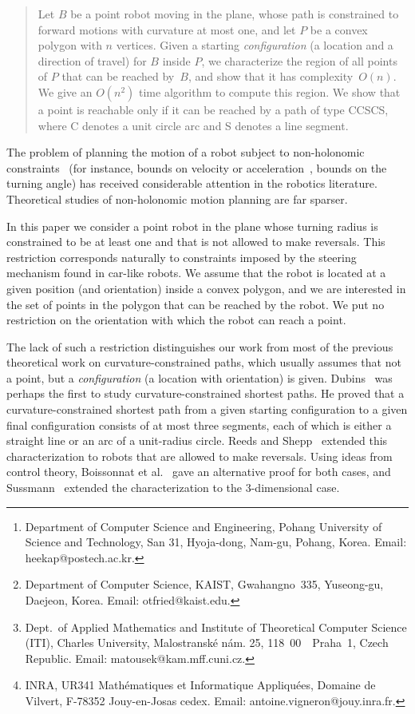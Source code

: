 \documentclass[a4paper]{article}
\author{Hee-Kap Ahn\thanks{Department of Computer
    Science and Engineering, Pohang University of Science and Technology,
    San 31, Hyoja-dong, Nam-gu, Pohang, Korea. Email: heekap@postech.ac.kr.}
  \and
  Otfried Cheong\thanks{Department of Computer Science, KAIST, Gwahangno~335,
    Yuseong-gu, Daejeon, Korea. Email: otfried@kaist.edu.}
  \and 
  Ji\v{r}\'{\i} Matou\v{s}ek\thanks{Dept.~of Applied Mathematics and Institute of Theoretical
    Computer Science (ITI), Charles University,
    Malostransk\'{e} n\'{a}m. 25, 118~00~~Praha~1, Czech Republic.
  Email: matousek@kam.mff.cuni.cz.}  
  \and 
  Antoine Vigneron\thanks{INRA, UR341 Math\'ematiques et Informatique Appliqu\'ees, 
  Domaine de Vilvert, F-78352 Jouy-en-Josas cedex. 
  Email: antoine.vigneron@jouy.inra.fr.}}
\makeatletter
\def\section{\@startsection {section}{1}{\z@}{-3.5ex plus -1ex minus
-.2ex}{2.3ex plus .2ex}{\large\bf}}
\makeatother
\begin{document}
\maketitle

\begin{abstract}
  Let $B$ be a point robot moving in the plane, whose path is
  constrained to forward motions with curvature at most one, and let
  $P$ be a convex polygon with $n$ vertices.  Given a starting
  \emph{configuration} (a location and a direction of travel) for $B$
  inside $P$, we characterize the region of all points of $P$ that can
  be reached by~$B$, and show that it has complexity~$O(n)$.  We give
  an $O(n^2)$ time algorithm to compute this region.  We show that a
  point is reachable only if it can be reached by a path of type
  CCSCS, where C denotes a unit circle arc and S denotes a line
  segment.
\end{abstract}

\section{Introduction}

The problem of planning the motion of a robot subject to non-holonomic
constraints~\cite{l-rmp-91, ss-ampr-90} (for instance, bounds on
velocity or acceleration~\cite{crr-eakpp-91, dxcr-kmp-93,
  rs-mppmo-94}, bounds on the turning angle) has received
considerable attention in the robotics literature.  Theoretical
studies of non-holonomic motion planning are far sparser.

In this paper we consider a point robot in the plane whose turning
radius is constrained to be at least one and that is not allowed to
make reversals.  This restriction corresponds naturally to constraints
imposed by the steering mechanism found in car-like robots.  We assume
that the robot is located at a given position (and orientation) inside
a convex polygon, and we are interested in the set of points in the
polygon that can be reached by the robot.  We put no restriction on
the orientation with which the robot can reach a point.

The lack of such a restriction distinguishes our work from most of the
previous theoretical work on curvature-constrained paths, which
usually assumes that not a point, but a \emph{configuration} (a
location with orientation) is given.  Dubins~\cite{d-cmlca-57} was
perhaps the first to study curvature-constrained shortest paths.  He
proved that a curvature-constrained shortest path from a given
starting configuration to a given final configuration consists of at
most three segments, each of which is either a straight line or an arc of
a unit-radius circle.  Reeds and Shepp~\cite{rs-opctg-90} extended
this characterization to robots that are allowed to make reversals.
Using ideas from control theory, Boissonnat et al.~\cite{bcl-spbcp-94}
gave an alternative proof for both cases, and Sussmann~\cite{s-sppcb-95}
extended the characterization to the 3-dimensional case.  
\end{document}
